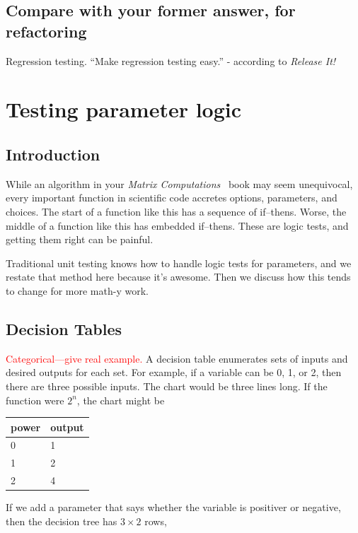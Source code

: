 \documentclass[fleqn,10pt]{olplainarticle}
\newcommand{\aside}[1]{\textcolor{red}{#1}}
\begin{document}
\subsection{Compare with your former answer, for refactoring}
Regression testing. ``Make regression testing easy.'' - according
to \emph{Release It!}




\section{Testing parameter logic}\label{sec:parameter-logic}
\subsection{Introduction}
While an algorithm in your \emph{Matrix Computations}~\citep{golub2013} book may seem
unequivocal, every important function in scientific code accretes
options, parameters, and choices.
The start of a function like this has
a sequence of if--thens. Worse, the middle of a function like this
has embedded if--thens. These are logic tests, and getting them
right can be painful.

Traditional unit testing knows how to handle logic tests for parameters,
and we restate that method here because it's awesome. Then we discuss
how this tends to change for more math-y work.

\subsection{Decision Tables}
\aside{Categorical---give real example.}
A decision table enumerates sets of inputs and desired outputs for each set.
For example, if a variable can be 0, 1, or 2, then there are three possible
inputs. The chart would be three lines long. If the function were $2^n$,
the chart might be

\begin{center}
\begin{tabular}{|l|l|}\hline
power & output \\ \hline
0 & 1 \\
1 & 2 \\
2 & 4 \\ \hline
\end{tabular}
\end{center}

If we add a parameter that says whether the variable is positiver or negative,
then the decision tree has $3\times 2$ rows,
\end{document}
